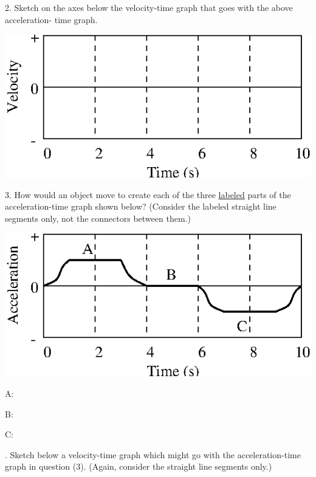 2. Sketch on the axes below the velocity-time graph that goes with the above
acceleration- time graph.

\vspace{0.3cm}
{\par\centering \includegraphics{slowing/slowing_fig7.eps} \par}
\vspace{0.3cm}

3. How would an object move to create each of the three \underline{labeled} parts of the
acceleration-time graph shown below? (Consider the labeled straight line segments only, not the connectors between them.)

\vspace{0.3cm}
{\par\centering \includegraphics{slowing/slowing_fig8.eps} \par}
\vspace{0.3cm}

\hspace{20mm}A: 
\answerspace{10mm}

\hspace{20mm}B: 
\answerspace{10mm}

\hspace{20mm}C:
\answerspace{10mm}

. Sketch below a velocity-time graph which might go with the acceleration-time
graph in question (3). (Again, consider the straight line segments only.)

